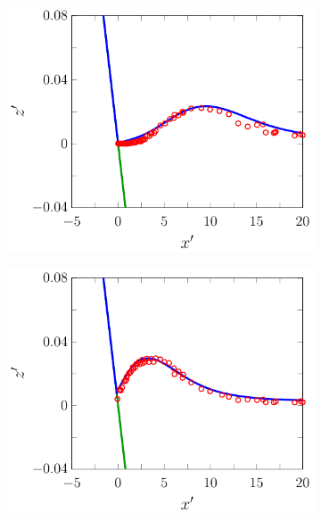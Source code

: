 \begin{figure}
	\centering
	\begin{subfigure}{0.5\textwidth}
		\includegraphics[width=\textwidth]{./chp6/figures/Experiment/Synolakis/H0p0185/FDVM/30s.pdf}
		\vspace{0.5cm}
	\end{subfigure}%
	\begin{subfigure}{0.5\textwidth}
		\includegraphics[width=\textwidth]{./chp6/figures/Experiment/Synolakis/H0p0185/FDVM/40s.pdf}
		\vspace{0.5cm}
	\end{subfigure}

\end{figure}
